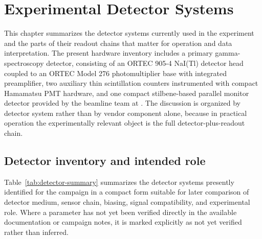\chapter{Experimental Detector Systems}

This chapter summarizes the detector systems currently used in the experiment and the parts of their readout chains that matter for operation and data interpretation. The present hardware inventory includes a primary gamma-spectroscopy detector, consisting of an ORTEC 905-4 NaI(Tl) detector head coupled to an ORTEC Model 276 photomultiplier base with integrated preamplifier, two auxiliary thin scintillation counters instrumented with compact Hamamatsu PMT hardware, and one compact stilbene-based parallel monitor detector provided by the beamline team at \NCALInstitute. The discussion is organized by detector system rather than by vendor component alone, because in practical operation the experimentally relevant object is the full detector-plus-readout chain.

\section{Detector inventory and intended role}

Table~\ref{tab:detector-summary} summarizes the detector systems presently identified for the campaign in a compact form suitable for later comparison of detector medium, sensor chain, biasing, signal compatibility, and experimental role. Where a parameter has not yet been verified directly in the available documentation or campaign notes, it is marked explicitly as not yet verified rather than inferred.

